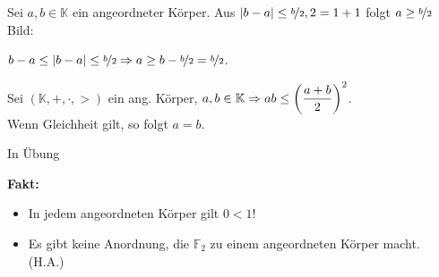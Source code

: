 \documentclass[../ana1.tex]{subfiles}
\begin{document}
\begin{bsp}
	Sei \(a,b\in\mathbb{K}\) ein angeordneter Körper. Aus \(|b-a|\leq \nicefrac{b}{2}, 2 = 1+1\) folgt \(a \geq \nicefrac{b}{2}\)
	Bild: %
	\begin{bew}
		\(b-a \leq |b-a| \leq \nicefrac{b}{2} \Rightarrow a \geq b - \nicefrac{b}{2} = \nicefrac{b}{2}\).
	\end{bew}
\end{bsp}
\begin{kor}
	Sei \((\mathbb{K},+,\cdot,>)\) ein ang. Körper, \(a,b\in\mathbb{K}\\
	\Rightarrow ab \leq {\left( \dfrac{a+b}{2}\right)}^2\).\\
	Wenn Gleichheit gilt, so folgt \(a=b\).
\end{kor}
\begin{bew}
	In Übung
\end{bew}
\textbf{Fakt:}
\begin{itemize}
	\item In jedem angeordneten Körper gilt \(0<1\)!
	\item Es gibt keine Anordnung, die \(\mathbb{F}_2\) zu einem angeordneten Körper macht. (H.A.)
\end{itemize}
\end{document}
